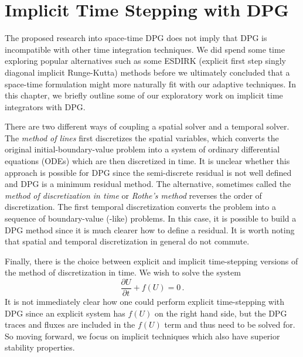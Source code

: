 \documentclass[Proposal.tex]{subfiles}
\begin{document}
\chapter{Implicit Time Stepping with DPG}
\label{sec:timestepping}
The proposed research into space-time DPG does not imply that DPG is incompatible with other time integration techniques. 
We did spend some time exploring popular alternatives such as some ESDIRK (explicit first step singly diagonal implicit Runge-Kutta) methods 
before we ultimately concluded that a space-time formulation might more naturally fit with our adaptive techniques.
In this chapter, we briefly outline some of our exploratory work on implicit time integrators with DPG.

There are two different ways of coupling a spatial solver and a temporal solver.
The \emph{method of lines} first discretizes the spatial variables, which converts the original initial-boundary-value problem into a system
of ordinary differential equations (ODEs) which are then discretized in time. 
It is unclear whether this approach is possible for DPG since the semi-discrete residual is not well defined and DPG is a minimum residual method.
The alternative, sometimes called the \emph{method of discretization in time} or \emph{Rothe's method} reverses the order of discretization.
The first temporal discretization converts the problem into a sequence of boundary-value (-like) problems. 
In this case, it is possible to build a DPG method since it is much clearer how to define a residual.
It is worth noting that spatial and temporal discretization in general do not commute\cite{DemkowiczTransientAcoustics}.


Finally, there is the choice between explicit and implicit time-stepping versions of the method of discretization in time.
We wish to solve the system
\[
\frac{\partial U}{\partial t}+f(U)=0\,.
\]
It is not immediately clear how one could perform explicit time-stepping with DPG since an explicit system has 
$f(U)$ on the right hand side, but the DPG traces and fluxes are included in the $f(U)$ term and thus need to be solved for.
So moving forward, we focus on implicit techniques which also have superior stability properties.
\end{document}
